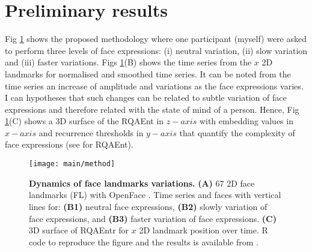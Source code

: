 \documentclass[12pt]{article}
\begin{document}
\section{Preliminary results}
Fig \ref{fig:method} shows the proposed methodology 
where one participant (myself) were asked to perform three levels of 
face expressions:
(i) neutral variation, (ii) slow variation and (iii) faster variations.
Figs \ref{fig:method}(B) shows the time series from the $x$ 2D landmarks
for normalised and smoothed time series.
It can be noted from the time series an increase of amplitude and 
variations as the face expressions varies. I can hypotheses that 
such changes can be related to subtle variation of face expressions
and therefore related with the state of mind of a person. 
Hence, Fig \ref{fig:method}(C) shows a 3D surface of the RQAEnt 
in $z-axis$ with embedding values in $x-axis$ and 
recurrence thresholds in $y-axis$ 
that quantify the complexity of face expressions 
(see \cite{2018arXiv181009249X} for RQAEnt).


\begin{figure}
\centering
\texttt{[image: main/method]}
    \caption{
	{\bf Dynamics of face landmarks variations.}
	{\bf(A)} 67 2D face landmarks (FL) with OpenFace \cite{baltrusaitis2018}.
	Time series and faces with vertical lines for: 
	{\bf(B1)} neutral face expressions,
	{\bf(B2)} slowly variation of face expressions, and
	{\bf(B3)} faster variation of face expressions.   
	{\bf(C)} 3D surface of RQAEntr for $x$ 2D landmark position over time.
	R code to reproduce the figure and the results 
	is available from \cite{xochicale2018repo}.
        }
\label{fig:method}
\end{figure}




\end{document}
